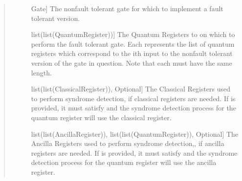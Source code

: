 \documentclass[letterpaper,10pt,english]{sphinxmanual}
\begin{document}
\begin{fulllineitems}
\begin{fulllineitems}
\begin{quote}
\begin{description}
\begin{description}
\item[{}] \leavevmode{[}Gate{]}
\sphinxAtStartPar
The non\sphinxhyphen{}fault tolerant gate for which to implement a fault tolerant version.

\item[{}] \leavevmode{[}list(list(QuantumRegister)){]}
\sphinxAtStartPar
The Quantum Registers to on which to perform the fault tolerant gate. Each  represents the list of quantum registers which correspond to the ith input to the non\sphinxhyphen{}fault tolerant version of the gate in question. Note that each  must have the same length.

\item[{}] \leavevmode{[}list(list(ClassicalRegister)), Optional{]}
\sphinxAtStartPar
The Classical Registers used to perform syndrome detection, if classical registers are needed. If  is provided, it must satisfy  and the syndrome detection process for the  quantum register will use the  classical register.

\item[{}] \leavevmode{[}list(list(AncillaRegister)), list(list(QuantumRegister)), Optional{]}
\sphinxAtStartPar
The Ancilla Registers used to perform syndrome detection,, if ancilla registers are needed. If  is provided, it must satisfy  and the syndrome detection process for the  quantum register will use the  ancilla register.

\end{description}

\end{description}\end{quote}

\end{fulllineitems}


\end{fulllineitems}

\end{document}
